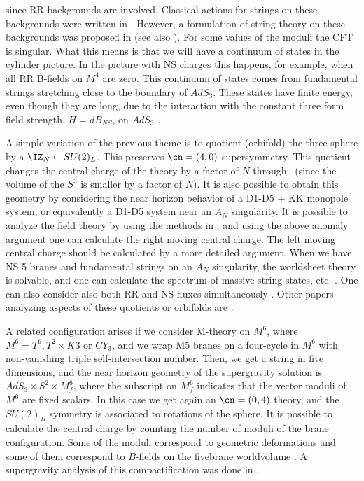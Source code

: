 since RR backgrounds are involved. Classical actions for 
strings on these backgrounds were written in 
\cite{Pesando:1999wm,Rahmfeld:1998zn,Park:1999un}. 
 However,  a formulation of 
string theory on these backgrounds was proposed in 
\cite{Berkovits:1999im} (see also 
\cite{Bershadsy:1999hk,Berenstein:1999gj,Yu:1998qw}).
For some values of the moduli the CFT is singular. 
What this means is that we will have a continuum of states in the 
cylinder picture. In the picture with NS charges this happens, for
example,
when all RR B-fields on $M^4$
 are zero. This continuum of states
comes from fundamental strings stretching close to the boundary of 
$AdS_3$. These states have finite energy, even though
they are long, due to the interaction 
with the constant three form  field strength, $H =dB_{NS}$, on $AdS_3$
\cite{Maldacena:1999uz,Seiberg:1999xz}.


A simple variation of the previous theme is to quotient (orbifold) 
the three-sphere
by a $\IZ_N \subset SU(2)_L$. 
This preserves $\cn=(4,0)$ supersymmetry.
This quotient changes the central charge of the theory by a factor
of $N$ through \brown\ (since the volume of the $S^3$ is smaller by a
factor of $N$). It is also possible to obtain this 
geometry by considering 
 the near horizon behavior of a D1-D5 + KK monopole 
system, or equivalently a D1-D5 system near an $A_N$ singularity. 
It is possible to analyze the field theory by using the methods
in \cite{Douglas:1996sw}, and using the above anomaly argument one
can calculate the right moving central charge. The left moving 
central charge should be calculated by a more detailed argument. 
When 
we have NS 5 branes and fundamental strings on an $A_N$ singularity,
the worldsheet theory is solvable, and one can calculate the spectrum 
of massive string states, etc. \cite{Kutasov:1998zh}. One can also 
consider also both RR and NS fluxes simultaneously \cite{Duff:1998cr}.
 Other papers analyzing aspects of these
quotients or orbifolds are
 \cite{Sugawara:1999qp,Sugawara:1999qp,Behrndt:1998gr,Yamaguchi:1999gb,%
Balasubramanian:1998ee}.


A related configuration arises if we consider M-theory on $M^6$, 
where $M^6 = T^6, T^2 \times K3$ or $CY_3$, and we wrap  M5 branes
on a four-cycle in $M^6$ with non-vanishing 
 triple self-intersection number.
Then, we get a string in five dimensions, and the near horizon geometry
of the supergravity solution is $AdS_3 \times S^2 \times M^6_f $,
where the subscript on $M^6_f$ indicates that the vector moduli of $M^6$
are fixed scalars. In this case we get again an $\cn=(0,4)$
 theory, and the
$SU(2)_R$ symmetry is associated  to rotations of the sphere. 
It is possible to calculate the central charge by counting 
the number of moduli of the brane configuration. Some of the moduli
correspond to geometric deformations and some of them correspond
to $B$-fields on the fivebrane worldvolume 
\cite{Maldacena:1997de,Minasian:1999qn}. A supergravity analysis of this
compactification was done in \cite{deBoer:1998ip,Fujii:1998tc}.

